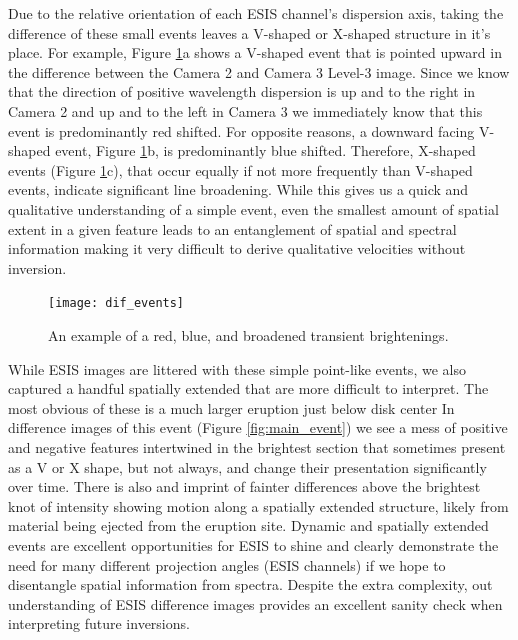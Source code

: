     	Due to the relative orientation of each ESIS channel's dispersion axis, taking the difference of these small events leaves a V-shaped or X-shaped structure in it's place.
    	For example, Figure \ref{fig:dif_events}a shows a V-shaped event that is pointed upward in the difference between the Camera 2 and Camera 3 Level-3 image.
    	Since we know that the direction of positive wavelength dispersion is up and to the right in Camera 2 and up and to the left in Camera 3 we immediately know that this event is predominantly red shifted.
    	For opposite reasons, a downward facing V-shaped event, Figure \ref{fig:dif_events}b, is predominantly blue shifted.
    	Therefore, X-shaped events (Figure \ref{fig:dif_events}c), that occur equally if not more frequently than V-shaped events, indicate significant line broadening.
    	While this gives us a quick and qualitative understanding of a simple event, even the smallest amount of spatial extent in a given feature leads to an entanglement of spatial and spectral information making it very difficult to derive qualitative velocities without inversion. 
    	
    	\begin{figure}[htb!]
    		\centering
    		\texttt{[image: dif\_events]}
    		\caption{An example of a red, blue, and broadened transient brightenings.}
    		\label{fig:dif_events}
    	\end{figure}
    	
    	While ESIS images are littered with these simple point-like events, we also captured a handful spatially extended that are more difficult to interpret.
    	The most obvious of these is a much larger eruption just below disk center 
    	In difference images of this event (Figure \ref{fig:main_event}) we see a mess of positive and negative features intertwined in the brightest section that sometimes present as a V or X shape, but not always, and change their presentation significantly over time.
    	There is also and imprint of fainter differences above the brightest knot of intensity showing motion along a spatially extended structure, likely from material being ejected from the eruption site.
    	Dynamic and spatially extended events are excellent opportunities for ESIS to shine and clearly demonstrate the need for many different projection angles (ESIS channels) if we hope to disentangle spatial information from spectra.
    	Despite the extra complexity, out understanding of ESIS difference images provides an excellent sanity check when interpreting future inversions.
    	
